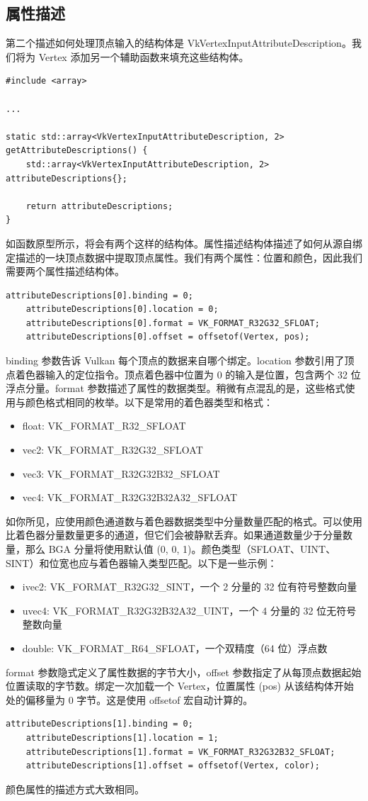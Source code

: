 \documentclass{ctexart}
\begin{document}
\subsection{属性描述}
第二个描述如何处理顶点输入的结构体是 VkVertexInputAttributeDescription。我们将为 Vertex 添加另一个辅助函数来填充这些结构体。
\begin{lstlisting}[language={[ANSI]C}]
#include <array>

...

static std::array<VkVertexInputAttributeDescription, 2> getAttributeDescriptions() {
	std::array<VkVertexInputAttributeDescription, 2> attributeDescriptions{};

	return attributeDescriptions;
}
\end{lstlisting}
如函数原型所示，将会有两个这样的结构体。属性描述结构体描述了如何从源自绑定描述的一块顶点数据中提取顶点属性。我们有两个属性：位置和颜色，因此我们需要两个属性描述结构体。
\begin{lstlisting}[language={[ANSI]C}]
	attributeDescriptions[0].binding = 0;
	attributeDescriptions[0].location = 0;
	attributeDescriptions[0].format = VK_FORMAT_R32G32_SFLOAT;
	attributeDescriptions[0].offset = offsetof(Vertex, pos);
\end{lstlisting}
binding 参数告诉 Vulkan 每个顶点的数据来自哪个绑定。location 参数引用了顶点着色器输入的定位指令。顶点着色器中位置为 0 的输入是位置，包含两个 32 位浮点分量。format 参数描述了属性的数据类型。稍微有点混乱的是，这些格式使用与颜色格式相同的枚举。以下是常用的着色器类型和格式：
\begin{itemize}
	\item float: VK\_FORMAT\_R32\_SFLOAT
	\item vec2: VK\_FORMAT\_R32G32\_SFLOAT
	\item vec3: VK\_FORMAT\_R32G32B32\_SFLOAT
	\item vec4: VK\_FORMAT\_R32G32B32A32\_SFLOAT
\end{itemize}
如你所见，应使用颜色通道数与着色器数据类型中分量数量匹配的格式。可以使用比着色器分量数量更多的通道，但它们会被静默丢弃。如果通道数量少于分量数量，那么 BGA 分量将使用默认值 (0, 0, 1)。颜色类型（SFLOAT、UINT、SINT）和位宽也应与着色器输入类型匹配。以下是一些示例：
\begin{itemize}
	\item ivec2: VK\_FORMAT\_R32G32\_SINT，一个 2 分量的 32 位有符号整数向量
	\item uvec4: VK\_FORMAT\_R32G32B32A32\_UINT，一个 4 分量的 32 位无符号整数向量
	\item double: VK\_FORMAT\_R64\_SFLOAT，一个双精度（64 位）浮点数
\end{itemize}
format 参数隐式定义了属性数据的字节大小，offset 参数指定了从每顶点数据起始位置读取的字节数。绑定一次加载一个 Vertex，位置属性 (pos) 从该结构体开始处的偏移量为 0 字节。这是使用 offsetof 宏自动计算的。
\begin{lstlisting}[language={[ANSI]C}]
	attributeDescriptions[1].binding = 0;
	attributeDescriptions[1].location = 1;
	attributeDescriptions[1].format = VK_FORMAT_R32G32B32_SFLOAT;
	attributeDescriptions[1].offset = offsetof(Vertex, color);	
\end{lstlisting}
颜色属性的描述方式大致相同。
\end{document}
